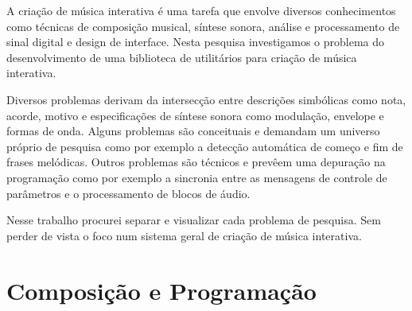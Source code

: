 \documentclass[draft]{ppgmus}
\begin{document}





A criação de música interativa é uma tarefa que envolve diversos 
conhecimentos como técnicas de composição musical, síntese sonora,
análise e processamento de sinal digital e design de interface.
Nesta pesquisa investigamos o problema do desenvolvimento de uma biblioteca
de utilitários para criação de música interativa. 


Diversos problemas derivam da intersecção entre descrições simbólicas
como nota, acorde, motivo e 
especificações de síntese sonora como modulação, envelope e formas de onda.
Alguns problemas são conceituais e demandam um universo próprio de 
pesquisa como por exemplo a detecção automática de começo e fim de
frases melódicas. Outros problemas são técnicos e prevêem uma depuração
na programação como por exemplo a sincronia entre as mensagens de controle de parâmetros
e o processamento de blocos de áudio. 

Nesse trabalho procurei separar e visualizar cada problema de pesquisa. Sem perder de vista o foco
num sistema geral de criação de música interativa.

\section{Composição e Programação}
  


\end{document}
